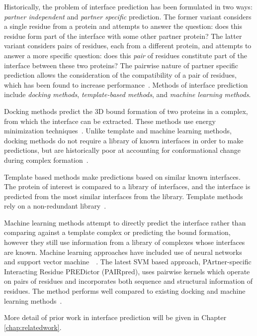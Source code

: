 Historically, the problem of interface prediction has been formulated in two ways: \textit{partner independent} and \textit{partner specific} prediction.
The former variant considers a single residue from a protein and attempts to answer the question: does this residue form part of the interface with some other partner protein?
The latter variant considers pairs of residues, each from a different protein, and attempts to answer a more specific question: does this \textit{pair} of residues constitute part of the interface between these two proteins?
The pairwise nature of partner specific prediction allows the consideration of the compatibility of a pair of residues, which has been found to increase performance~\cite{ahmad2011, minhas2014}.
Methods of interface prediction include \textit{docking methods}, \textit{template-based methods}, and \textit{machine learning methods}.

Docking methods predict the 3D bound formation of two proteins in a complex, from which the interface can be extracted. 
These methods use energy minimization techniques~\cite{chen2003, zundert2016}.
Unlike template and machine learning methods, docking methods do not require a library of known interfaces in order to make predictions, but are historically poor at accounting for conformational change during complex formation~\cite{ezkurdia2009}.

Template based methods make predictions based on similar known interfaces.
The protein of interest is compared to a library of interfaces, and the interface is predicted from the most similar interfaces from the library.
Template methods rely on a non-redundant library~\cite{tuncbag2011}.

Machine learning methods attempt to directly predict the interface rather than comparing against a template complex or predicting the bound formation, however they still use information from a library of complexes whose interfaces are known.
Machine learning approaches have included use of neural networks and support vector machine~\cite{ahmad2011}~\cite{minhas2014}.
The latest SVM based approach, PArtner-specific Interacting Residue PREDictor (PAIRpred), uses pairwise kernels which operate on pairs of residues and incorporates both sequence and structural information of residues.
The method performs well compared to existing docking and machine learning methods~\cite{minhas2014}.

More detail of prior work in interface prediction will be given in Chapter \ref{chap:relatedwork}.